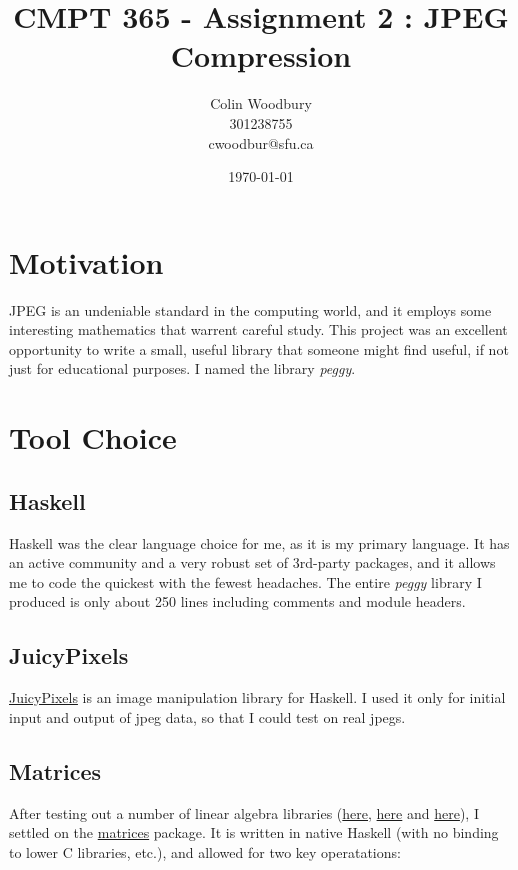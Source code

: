\documentclass{article}
\begin{document}
\title{CMPT 365 - Assignment 2 : JPEG Compression}
\author{Colin Woodbury\\ 301238755\\ cwoodbur@sfu.ca}
\date{\today}
\maketitle

\tableofcontents
\clearpage

\section{Motivation}
JPEG is an undeniable standard in the computing world, and it employs
some interesting mathematics that warrent careful study. This project
was an excellent opportunity to write a small, useful library that
someone might find useful, if not just for educational purposes. I named
the library \emph{peggy}.

\section{Tool Choice}
\subsection{Haskell}
Haskell was the clear language choice for me, as it is my primary language.
It has an active community and a very robust set of 3rd-party packages,
and it allows me to code the quickest with the fewest headaches. The
entire \emph{peggy} library I produced is only about 250 lines including
comments and module headers.

\subsection{JuicyPixels}
\href{http://hackage.haskell.org/package/JuicyPixels-3.2.7}{JuicyPixels}
is an image manipulation library for Haskell. I used it only for initial
input and output of jpeg data, so that I could test on real jpegs.

\subsection{Matrices}
After testing out a number of linear algebra libraries
(\href{https://github.com/fosskers/playground/tree/master/haskell/eigen}{here}, \href{https://github.com/fosskers/playground/tree/master/haskell/linear}{here} and \href{https://github.com/fosskers/playground/tree/master/haskell/matrices}{here}), I settled on the
\href{http://hackage.haskell.org/package/matrices}{matrices} package.
It is written in native Haskell (with no binding to lower C libraries, etc.),
and allowed for two key operatations:
\end{document}
